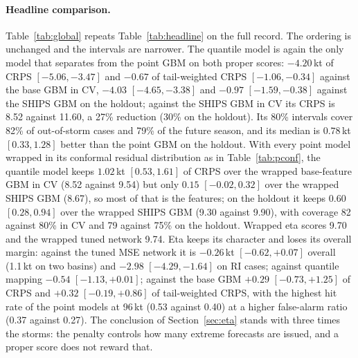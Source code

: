 \documentclass[11pt]{article}
\begin{document}
\paragraph{Headline comparison.} Table~\ref{tab:global} repeats Table~\ref{tab:headline} on the
full record. The ordering is unchanged and the intervals are narrower. The quantile model is
again the only model that separates from the point GBM on both proper scores: $-4.20$\,kt of
CRPS $[-5.06, -3.47]$ and $-0.67$ of tail-weighted CRPS $[-1.06, -0.34]$ against the base GBM
in CV, $-4.03$ $[-4.65, -3.38]$ and $-0.97$ $[-1.59, -0.38]$ against the SHIPS GBM on the
holdout; against the SHIPS GBM in CV its CRPS is 8.52 against 11.60, a 27\% reduction (30\%
on the holdout). Its 80\% intervals cover 82\% of out-of-storm cases and 79\% of the future
season, and its median is $0.78$\,kt $[0.33, 1.28]$ better than the point GBM on the holdout.
With every point model wrapped in its conformal residual distribution as in
Table~\ref{tab:pconf}, the quantile model keeps $1.02$\,kt $[0.53, 1.61]$ of CRPS over the
wrapped base-feature GBM in CV (8.52 against 9.54) but only $0.15$ $[-0.02, 0.32]$ over the
wrapped SHIPS GBM (8.67), so most of that is the features; on the holdout it keeps $0.60$
$[0.28, 0.94]$ over the wrapped SHIPS GBM (9.30 against 9.90), with coverage 82 against 80\% in
CV and 79 against 75\% on the holdout. Wrapped eta scores 9.70 and the wrapped tuned network
9.74.
Eta keeps its character and loses its overall margin: against the tuned MSE network it is
$-0.26$\,kt $[-0.62, +0.07]$ overall (1.1\,kt on two basins) and $-2.98$ $[-4.29, -1.64]$ on
RI cases; against quantile mapping $-0.54$ $[-1.13, +0.01]$; against the base GBM $+0.29$
$[-0.73, +1.25]$ of CRPS and $+0.32$ $[-0.19, +0.86]$ of tail-weighted CRPS, with the highest
hit rate of the point models at 96\,kt (0.53 against 0.40) at a higher false-alarm ratio
(0.37 against 0.27). The conclusion of Section~\ref{sec:eta} stands with three times the
storms: the penalty controls how many extreme forecasts are issued, and a proper score does not
reward that.
\end{document}

